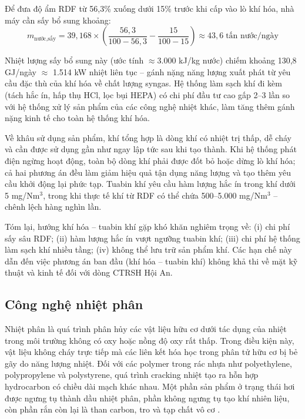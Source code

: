 \documentclass[../main.tex]{subfiles}
\begin{document}
Để đưa độ ẩm RDF từ 56,3\% xuống dưới 15\% trước khi cấp vào lò khí hóa, nhà máy cần sấy bổ sung khoảng:
\begin{equation}
m_{\text{nước,sấy}} = 39{,}168 \times \left( \frac{56{,}3}{100 - 56{,}3} - \frac{15}{100 - 15} \right)
\approx 43{,}6 \;\text{tấn nước/ngày}
\end{equation}

Nhiệt lượng sấy bổ sung này (ước tính $\approx$3.000 kJ/kg nước) chiếm khoảng 130,8 GJ/ngày $\approx$ 1.514 kW nhiệt liên tục -- gánh nặng năng lượng xuất phát từ yêu cầu đặc thù của khí hóa về chất lượng syngas. Hệ thống làm sạch khí đi kèm (tách hắc ín, hấp thụ HCl, lọc bụi HEPA) có chi phí đầu tư cao gấp 2--3 lần so với hệ thống xử lý sản phẩm của các công nghệ nhiệt khác, làm tăng thêm gánh nặng kinh tế cho toàn hệ thống khí hóa.

Về khâu sử dụng sản phẩm, khí tổng hợp là dòng khí có nhiệt trị thấp, dễ cháy và cần được sử dụng gần như ngay lập tức sau khi tạo thành. Khi hệ thống phát điện ngừng hoạt động, toàn bộ dòng khí phải được đốt bỏ hoặc dừng lò khí hóa; cả hai phương án đều làm giảm hiệu quả tận dụng năng lượng và tạo thêm yêu cầu khởi động lại phức tạp. Tuabin khí yêu cầu hàm lượng hắc ín trong khí dưới 5 mg/Nm$^3$, trong khi thực tế khí từ RDF có thể chứa 500--5.000 mg/Nm$^3$ -- chênh lệch hàng nghìn lần.

Tóm lại, hướng khí hóa -- tuabin khí gặp khó khăn nghiêm trọng về: (i) chi phí sấy sâu RDF; (ii) hàm lượng hắc ín vượt ngưỡng tuabin khí; (iii) chi phí hệ thống làm sạch khí nhiều tầng; (iv) không thể lưu trữ sản phẩm khí. Các hạn chế này dẫn đến việc phương án ban đầu (khí hóa -- tuabin khí) không khả thi về mặt kỹ thuật và kinh tế đối với dòng CTRSH Hội An.


\subsection{Công nghệ nhiệt phân}
\label{sec:co-so-nhiet-phan}

Nhiệt phân là quá trình phân hủy các vật liệu hữu cơ dưới tác dụng của nhiệt trong môi trường không có oxy hoặc nồng độ oxy rất thấp. Trong điều kiện này, vật liệu không cháy trực tiếp mà các liên kết hóa học trong phân tử hữu cơ bị bẻ gãy do năng lượng nhiệt. Đối với các polymer trong rác nhựa như polyethylene, polypropylene và polystyrene, quá trình cracking nhiệt tạo ra hỗn hợp hydrocarbon có chiều dài mạch khác nhau. Một phần sản phẩm ở trạng thái hơi được ngưng tụ thành dầu nhiệt phân, phần không ngưng tụ tạo khí nhiên liệu, còn phần rắn còn lại là than carbon, tro và tạp chất vô cơ \cite{Sharuddin2016,Williams2007}.
\end{document}
